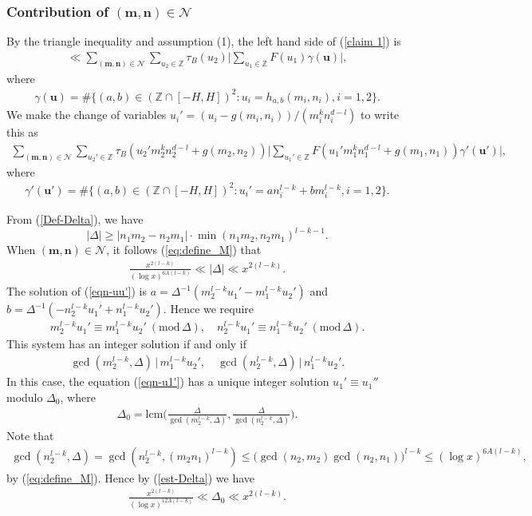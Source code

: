 \documentclass[reqno, 11pt]{amsart}
\renewcommand{\leq}{\leqslant}
\renewcommand{\geq}{\geqslant}
\theoremstyle{definition}
\theoremstyle{definition}
\renewcommand{\geq}{\geqslant}
\renewcommand{\leq}{\leqslant}
\renewcommand{\mod}{\mathrm{mod}\,}
\newcommand{\lcm}{\mathrm{lcm}}
\newcommand{\mm}{\mathbf{m}}
\newcommand{\nn}{\mathbf{n}}
\newcommand{\uu}{\mathbf{u}}
\newcommand{\ZZ}{\mathbb{Z}}
\numberwithin{equation}{section}
\begin{document}
\subsubsection*{Contribution of $(\mm,\nn) \in \mathcal{N}$}

By the triangle inequality and assumption (1), the left hand side of (\ref{claim 1}) is 
\begin{align}\label{claim 2}
     \ll \sum_{(\mm, \nn) \in \mathcal{N}} \sum_{u_2 \in \ZZ} \tau_B(u_2) \Big| \sum_{u_1 \in \ZZ} F(u_1) \gamma(\uu)  \Big|,
\end{align}
where
\begin{align*}
	\gamma(\uu) = \#\{ (a,b) \in (\ZZ \cap [-H,H])^2: u_i = h_{a,b}(m_i, n_i), i = 1,2 \}.
\end{align*}
We make the change of variables $u_i' = (u_i - g(m_i, n_i))/(m_i^{k}n_i^{d-l})$ to write this as
\begin{align*}
	\sum_{(\mm, \nn) \in \mathcal{N}} \sum_{u_2' \in \ZZ} \tau_B(u_2' m_2^k n_2^{d-l} + g(m_2,n_2)) \Big| \sum_{u_1' \in \ZZ} F(u_1'm_1^kn_1^{d-l} + g(m_1,n_1))  \gamma'(\uu')  \Big|,
\end{align*}
where
\begin{align}\label{eqn-uu'}
	\gamma'(\uu') = \#\{ (a,b) \in (\ZZ \cap [-H,H])^2: u_i' = a n_i^{l-k} + b m_i^{l-k}, i = 1,2 \}.
\end{align}

From (\ref{Def-Delta}), we have
$$|\Delta| \geq |n_1m_2 - n_2m_1| \cdot \min(n_1m_2, n_2m_1)^{l-k-1}.$$
When $(\mm,\nn) \in \mathcal{N}$, it follows (\ref{eq:define_M}) that
\begin{align}\label{est-Delta}
	\frac{x^{2(l-k)}}{(\log x)^{6A(l-k)}} \ll |\Delta| \ll x^{2(l-k)} .
\end{align}
The solution of (\ref{eqn-uu'}) is $a = \Delta^{-1}(m_2^{l-k}u_1' - m_1^{l-k}u_2')$ and $b = \Delta^{-1}(-n_2^{l-k}u_1' + n_1^{l-k}u_2').$ Hence we require
\begin{align}\label{eqn-u1'}
    m_2^{l-k}u_1' \equiv m_1^{l-k}u_2' \ (\mod \Delta), \quad n_2^{l-k}u_1' \equiv n_1^{l-k}u_2' \ (\mod \Delta).
\end{align}
This system has an integer solution if and only if
\begin{align}\label{cri-u1'}
    \gcd(m_2^{l-k}, \Delta) \, \big| \, m_1^{l-k}u_2', \quad \gcd(n_2^{l-k}, \Delta) \, \big| \, n_1^{l-k}u_2'.
\end{align}
In this case, the equation (\ref{eqn-u1'}) has a unique integer solution $u_1' \equiv u_1''$ modulo $\Delta_0$, where
\begin{align*}
    \Delta_0 = \lcm \Big( \frac{\Delta}{\gcd(m_2^{l-k}, \Delta)}, \frac{\Delta}{\gcd(n_2^{l-k}, \Delta)} \Big).
\end{align*}
Note that
\begin{align*}
    \gcd(n_2^{l-k}, \Delta) = \gcd(n_2^{l-k}, (m_2n_1)^{l-k}) \leq \big( \gcd(n_2, m_2) \gcd(n_2,n_1) \big)^{l-k} \leq (\log x)^{6A(l-k)},
\end{align*}
by (\ref{eq:define_M}). Hence by (\ref{est-Delta}) we have
\begin{align}\label{est-Delta0}
    \frac{x^{2(l-k)}}{(\log x)^{12A(l-k)}} \ll \Delta_0 \ll x^{2(l-k)} .
\end{align}
\end{document}
